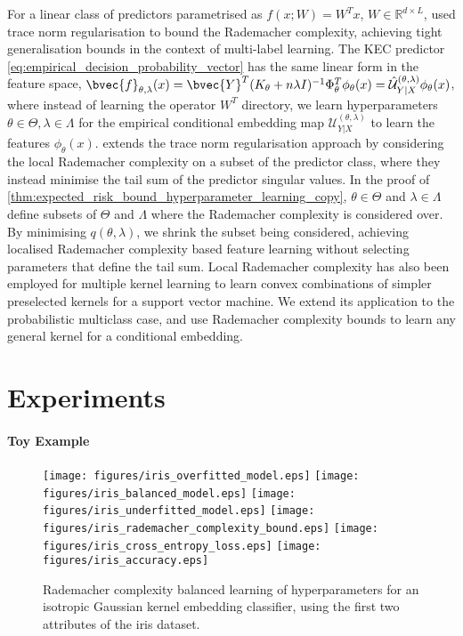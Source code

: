 \documentclass{article}
\begin{document}
	For a linear class of predictors parametrised as $f(x; W) = W^{T} x$, $W \in \mathbb{R}^{d \times L}$, \cite{yu2014large} used trace norm regularisation to bound the Rademacher complexity, achieving tight generalisation bounds in the context of multi-label learning. The KEC predictor \eqref{eq:empirical_decision_probability_vector} has the same linear form in the feature space, $\bvec{f}_{\theta, \lambda}(x) = \bvec{Y}^{T} (K_{\theta} + n \lambda I)^{-1} \Phi_{\theta}^{T} \phi_{\theta}(x) = \hat{\mathcal{U}}^{(\theta, \lambda)}_{Y | X} \phi_{\theta}(x)$, where instead of learning the operator $W^{T}$ directory, we learn hyperparameters $\theta \in \Theta, \lambda \in \Lambda$ for the empirical conditional embedding map $\mathcal{U}^{(\theta, \lambda)}_{Y | X}$ to learn the features $\phi_{\theta}(x)$. \cite{xu2016local} extends the trace norm regularisation approach by considering the local Rademacher complexity on a subset of the predictor class, where they instead minimise the tail sum of the predictor singular values. In the proof of \cref{thm:expected_risk_bound_hyperparameter_learning_copy}, $\theta \in \Theta$ and $\lambda \in \Lambda$ define subsets of $\Theta$ and $\Lambda$ where the Rademacher complexity is considered over. By minimising $q(\theta, \lambda)$, we shrink the subset being considered, achieving localised Rademacher complexity based feature learning without selecting parameters that define the tail sum. Local Rademacher complexity has also been employed for multiple kernel learning \citep{kloft2011local, cortes2013learning} to learn convex combinations of simpler preselected kernels for a support vector machine. We extend its application to the probabilistic multiclass case, and use Rademacher complexity bounds to learn any general kernel for a conditional embedding.

\section{Experiments}
\label{sec:experiments}

	\paragraph{Toy Example}
	
		\begin{figure}[t]
			\centering
			\texttt{[image: figures/iris\_overfitted\_model.eps]}
			\texttt{[image: figures/iris\_balanced\_model.eps]}
			\texttt{[image: figures/iris\_underfitted\_model.eps]}
			\texttt{[image: figures/iris\_rademacher\_complexity\_bound.eps]}
			\texttt{[image: figures/iris\_cross\_entropy\_loss.eps]}
			\texttt{[image: figures/iris\_accuracy.eps]}
			\caption{Rademacher complexity balanced learning of hyperparameters for an isotropic Gaussian kernel embedding classifier, using the first two attributes of the iris dataset.}
			\label{fig:iris}
		\end{figure}
		
\end{document}
